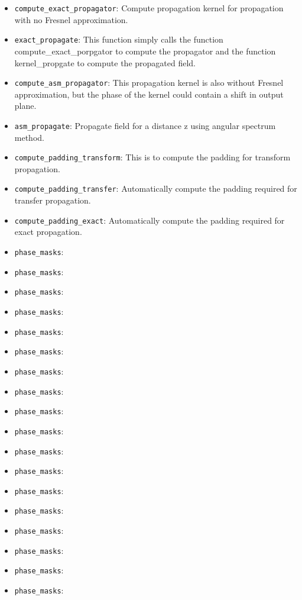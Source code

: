 \documentclass[a4paper,12pt]{report}
\begin{document}
\begin{itemize}
    \item \texttt{compute\_exact\_propagator}: Compute propagation kernel for propagation with no Fresnel approximation.
    \item \texttt{exact\_propagate}: This function simply calls the function compute\_exact\_porpgator to compute the propagator and the function kernel\_propgate to compute the propagated field.
    \item \texttt{compute\_asm\_propagator}: This propagation kernel is also without Fresnel approximation, but the phase of the kernel could contain a shift in output plane.
    \item \texttt{asm\_propagate}: Propagate field for a distance z using angular spectrum method.
    \item \texttt{compute\_padding\_transform}: This is to compute the padding for transform propagation.
    \item \texttt{compute\_padding\_transfer}: Automatically compute the padding required for transfer propagation.
    \item \texttt{compute\_padding\_exact}: Automatically compute the padding required for exact propagation.
    \item \texttt{phase\_masks}:
    \item \texttt{phase\_masks}:
    \item \texttt{phase\_masks}:
    \item \texttt{phase\_masks}:
    \item \texttt{phase\_masks}:
    \item \texttt{phase\_masks}:
    \item \texttt{phase\_masks}:
    \item \texttt{phase\_masks}:
    \item \texttt{phase\_masks}:
    \item \texttt{phase\_masks}:
    \item \texttt{phase\_masks}:
    \item \texttt{phase\_masks}:
    \item \texttt{phase\_masks}:
    \item \texttt{phase\_masks}:
    \item \texttt{phase\_masks}:
    \item \texttt{phase\_masks}:
    \item \texttt{phase\_masks}:
    \item \texttt{phase\_masks}:
\end{itemize}
\end{document}
